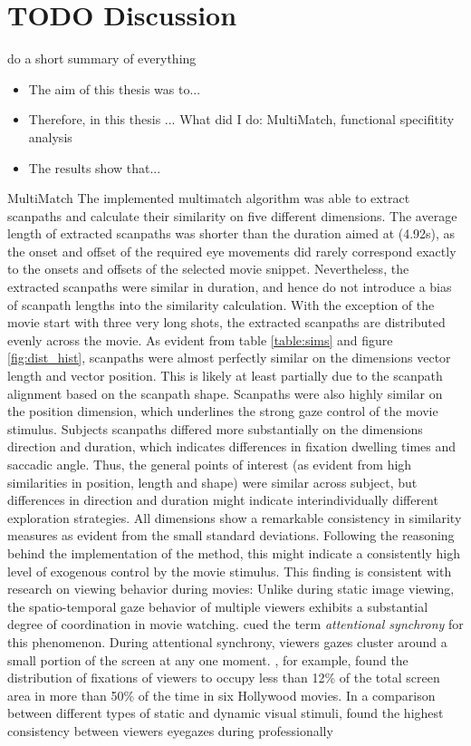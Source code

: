 \documentclass[a4paper, 12pt]{scrreprt}
\begin{document}
\chapter{TODO Discussion}\label{section:discussion}
do a short summary of everything

\begin{itemize}
	\item The aim of this thesis was to...
	\item Therefore, in this thesis ... What did I do: MultiMatch, functional specifitity analysis
	\item The results show that...
\end{itemize}

MultiMatch\newline
The implemented multimatch algorithm was able to extract scanpaths and calculate their similarity on five different dimensions. The average length of extracted scanpaths was shorter than the duration aimed at (4.92s), as the onset and offset of the required eye movements did rarely correspond exactly to the onsets and offsets of the selected movie snippet. Nevertheless, the extracted scanpaths were similar in duration, and hence do not introduce a bias of scanpath lengths into the similarity calculation. With the exception of the movie start with three very long shots, the extracted scanpaths are distributed evenly across the movie. As evident from table \ref{table:sims} and figure \ref{fig:dist_hist}, scanpaths were almost perfectly similar on the dimensions vector length and vector position. This is likely at least partially due to the scanpath alignment based on the scanpath shape. Scanpaths were also highly similar on the position dimension, which underlines the strong gaze control of the movie stimulus. Subjects scanpaths differed more substantially on the dimensions direction and duration, which indicates differences in fixation dwelling times and saccadic angle. Thus, the general points of interest (as evident from high similarities in position, length and shape) were similar across subject, but differences in direction and duration might indicate interindividually different exploration strategies. All dimensions show a remarkable consistency in similarity measures as evident from the small standard deviations. Following the reasoning behind the implementation of the method, this might indicate a consistently high level of exogenous control by the movie stimulus. This finding is consistent with research on viewing behavior during movies: Unlike during static image viewing, the spatio-temporal gaze behavior of multiple viewers exhibits a substantial degree of coordination in movie watching. \textcite{smith2008attentional} cued the term \textit{attentional synchrony} for this phenomenon. During attentional synchrony, viewers gazes cluster around a small portion of the screen at any one moment. \textcite{goldstein2007people}, for example, found the distribution of fixations of viewers to occupy less than 12\% of the total screen area in more than 50\% of the time in six Hollywood movies. In a comparison between different types of static and dynamic visual stimuli, \textcite{dorr2010variability} found the highest consistency between viewers eyegazes during professionally 
\end{document}
